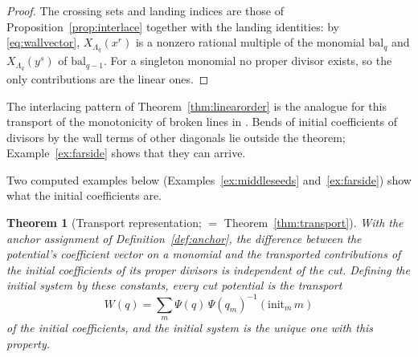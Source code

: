 \documentclass[11pt]{amsart}
\newtheorem{theorem}{Theorem}[section]
\theoremstyle{definition}
\theoremstyle{remark}
\begin{document}
\begin{proof}
The crossing sets and landing indices are those of
Proposition~\ref{prop:interlace} together with the landing identities: by
\eqref{eq:wallvector}, $X_{\Lambda_{q}}(x^{r})$ is a nonzero rational
multiple of the monomial $\mathrm{bal}_{q}$ and $X_{\Lambda_{q}}(y^{s})$ of
$\mathrm{bal}_{q-1}$. For a singleton
monomial no proper divisor exists, so the only contributions are the linear
ones.
\end{proof}

The interlacing pattern of Theorem~\ref{thm:linearorder} is the analogue for
this transport of the monotonicity of broken lines in \cite{CPS}.  Bends of
initial coefficients of divisors by the wall terms of other diagonals lie outside
the theorem; Example~\ref{ex:farside} shows that they can arrive.

Two computed examples below (Examples~\ref{ex:middleseeds}
and~\ref{ex:farside}) show what the initial coefficients are.

\begin{theorem}[Transport representation; $=$ Theorem~\ref{thm:transport}]
\label{thm:transport7}
With the anchor assignment of Definition~\ref{def:anchor}, the difference between
the potential's coefficient vector on a monomial and the transported contributions
of the initial coefficients of its proper divisors is independent of the cut.
Defining the \emph{initial system} by these constants, every cut potential is
the transport
\[
W(q)=\sum_{m}\Psi(q)\,\Psi(q_m)^{-1}(\mathrm{init}_{m}\,m)
\]
of the initial coefficients, and the initial system is the unique one with
this property.
\end{theorem}
\end{document}
